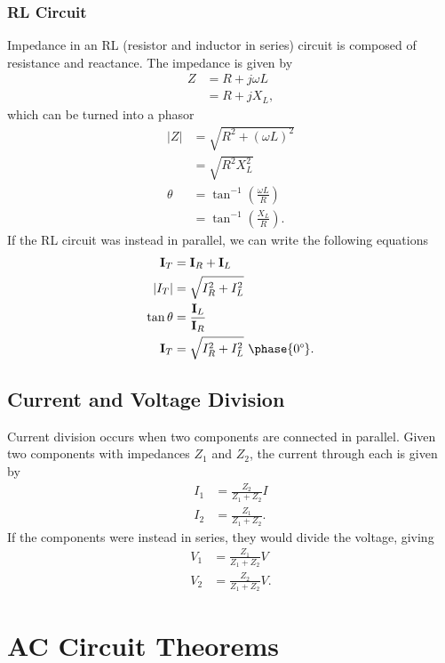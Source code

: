\documentclass{article}
\begin{document}
\subsubsection{RL Circuit}
Impedance in an RL (resistor and inductor in series) circuit is composed of resistance and reactance. The impedance is given by
\begin{align*}
    Z &= R+j\omega L\\
      &=R+jX_L,
\end{align*}
which can be turned into a phasor
\begin{align*}
    \left| Z \right| &= \sqrt{R^2+\left( \omega L \right)^2} \\
                     &= \sqrt{R^2X_L^2}\\
    \theta &= \tan^{-1}\left( \frac{\omega L}{R}\right)\\
                     &=\tan^{-1}\left( \frac{X_L}{R} \right).
\end{align*}
If the RL circuit was instead in parallel, we can write the following equations
\begin{align*}
    \mathbf{I}_T &= \mathbf{I}_R+\mathbf{I}_L\\
    \left| I_T \right|&=\sqrt{I_R^2+I_L^2}\\
    \tan\theta &=\frac{\mathbf{I}_L}{\mathbf{I}_R}\\
    \mathbf{I}_T&=\sqrt{I_R^2+I_L^2}\ \phase{0\degree}.
\end{align*}

\subsection{Current and Voltage Division}
Current division occurs when two components are connected in parallel. Given two components with impedances $Z_1$ and $Z_2$, the current through each is given by
\begin{align*}
    I_1 &= \frac{Z_2}{Z_1+Z_2}I\\
    I_2&=\frac{Z_1}{Z_1+Z_2}.
\end{align*}
If the components were instead in series, they would divide the voltage, giving
\begin{align*}
    V_1 &= \frac{Z_1}{Z_1+Z_2}V\\
    V_2&= \frac{Z_2}{Z_1+Z_2}V.
\end{align*}

\section{AC Circuit Theorems}
\end{document}
